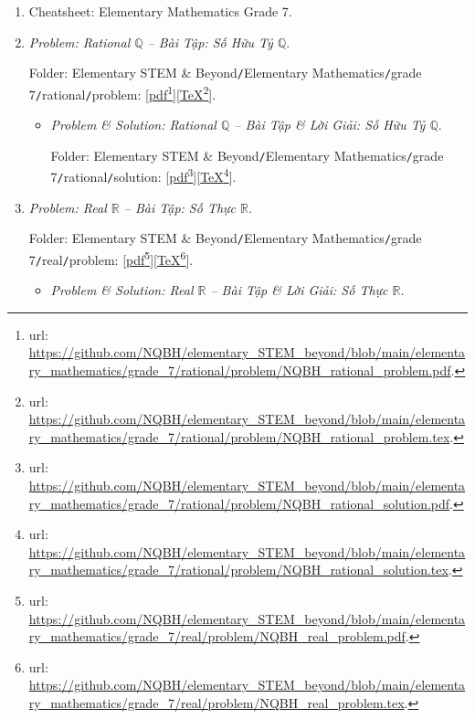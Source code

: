 \documentclass[12pt]{article}
\begin{document}
\begin{enumerate}
	\item Cheatsheet: Elementary Mathematics Grade 7.
	\item {\it Problem: Rational $\mathbb{Q}$ -- Bài Tập: Số Hữu Tỷ $\mathbb{Q}$}.
	
	Folder: {\sf Elementary STEM \& Beyond{\tt/}Elementary Mathematics{\tt/}grade 7{\tt/}rational{\tt/}problem}: [\href{https://github.com/NQBH/elementary_STEM_beyond/blob/main/elementary_mathematics/grade_7/rational/problem/NQBH_rational_problem.pdf}{pdf}\footnote{{\sc url}: \url{https://github.com/NQBH/elementary_STEM_beyond/blob/main/elementary_mathematics/grade_7/rational/problem/NQBH_rational_problem.pdf}.}][\href{https://github.com/NQBH/elementary_STEM_beyond/blob/main/elementary_mathematics/grade_7/rational/problem/NQBH_rational_problem.tex}{\TeX}\footnote{{\sc url}: \url{https://github.com/NQBH/elementary_STEM_beyond/blob/main/elementary_mathematics/grade_7/rational/problem/NQBH_rational_problem.tex}.}].
	\begin{itemize}
		\item {\it Problem \& Solution: Rational $\mathbb{Q}$ -- Bài Tập \& Lời Giải: Số Hữu Tỷ $\mathbb{Q}$}.
		
		Folder: {\sf Elementary STEM \& Beyond{\tt/}Elementary Mathematics{\tt/}grade 7{\tt/}rational{\tt/}solution}: [\href{https://github.com/NQBH/elementary_STEM_beyond/blob/main/elementary_mathematics/grade_7/rational/problem/NQBH_rational_solution.pdf}{pdf}\footnote{{\sc url}: \url{https://github.com/NQBH/elementary_STEM_beyond/blob/main/elementary_mathematics/grade_7/rational/problem/NQBH_rational_solution.pdf}.}][\href{https://github.com/NQBH/elementary_STEM_beyond/blob/main/elementary_mathematics/grade_7/rational/problem/NQBH_rational_solution.tex}{\TeX}\footnote{{\sc url}: \url{https://github.com/NQBH/elementary_STEM_beyond/blob/main/elementary_mathematics/grade_7/rational/problem/NQBH_rational_solution.tex}.}].
	\end{itemize}
	\item {\it Problem: Real $\mathbb{R}$ -- Bài Tập: Số Thực $\mathbb{R}$}.
	
	Folder: {\sf Elementary STEM \& Beyond{\tt/}Elementary Mathematics{\tt/}grade 7{\tt/}real{\tt/}problem}: [\href{https://github.com/NQBH/elementary_STEM_beyond/blob/main/elementary_mathematics/grade_7/real/problem/NQBH_real_problem.pdf}{pdf}\footnote{{\sc url}: \url{https://github.com/NQBH/elementary_STEM_beyond/blob/main/elementary_mathematics/grade_7/real/problem/NQBH_real_problem.pdf}.}][\href{https://github.com/NQBH/elementary_STEM_beyond/blob/main/elementary_mathematics/grade_7/real/problem/NQBH_real_problem.tex}{\TeX}\footnote{{\sc url}: \url{https://github.com/NQBH/elementary_STEM_beyond/blob/main/elementary_mathematics/grade_7/real/problem/NQBH_real_problem.tex}.}].
	\begin{itemize}
		\item {\it Problem \& Solution: Real $\mathbb{R}$ -- Bài Tập \& Lời Giải: Số Thực $\mathbb{R}$}.
		

\end{itemize}
\end{enumerate}
\end{document}
